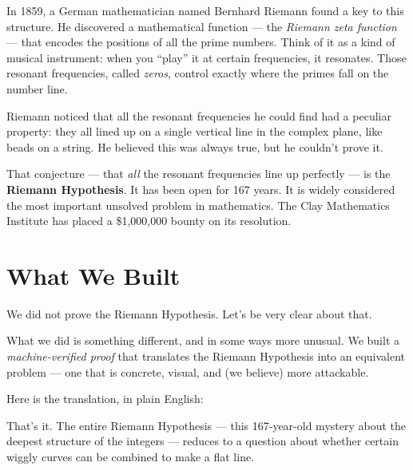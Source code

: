 \documentclass[12pt,a4paper]{article}
\begin{document}
In 1859, a German mathematician named Bernhard Riemann found a key to
this structure. He discovered a mathematical function --- the
\emph{Riemann zeta function} --- that encodes the positions of all
the prime numbers. Think of it as a kind of musical instrument: when
you ``play'' it at certain frequencies, it resonates. Those resonant
frequencies, called \emph{zeros}, control exactly where the primes
fall on the number line.

Riemann noticed that all the resonant frequencies he could find
had a peculiar property: they all lined up on a single vertical line
in the complex plane, like beads on a string. He believed this was
always true, but he couldn't prove it.

That conjecture --- that \emph{all} the resonant frequencies line up
perfectly --- is the \textbf{Riemann Hypothesis}. It has been open
for 167 years. It is widely considered the most important unsolved
problem in mathematics. The Clay Mathematics Institute has placed a
\$1,000,000 bounty on its resolution.

\section*{What We Built}

We did not prove the Riemann Hypothesis. Let's be very clear about that.

What we did is something different, and in some ways more unusual. We
built a \emph{machine-verified proof} that translates the Riemann
Hypothesis into an equivalent problem --- one that is concrete, visual,
and (we believe) more attackable.

Here is the translation, in plain English:

\begin{center}
\end{center}

That's it. The entire Riemann Hypothesis --- this 167-year-old mystery
about the deepest structure of the integers --- reduces to a question
about whether certain wiggly curves can be combined to make a flat line.
\end{document}
